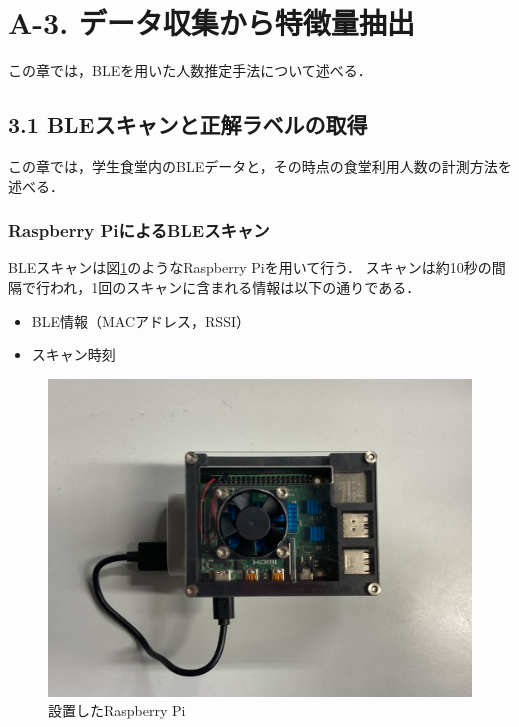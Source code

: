 \section*{A-3. データ収集から特徴量抽出}
この章では，BLEを用いた人数推定手法について述べる．

\subsection*{3.1 BLEスキャンと正解ラベルの取得}
この章では，学生食堂内のBLEデータと，その時点の食堂利用人数の計測方法を述べる．

\subsubsection*{Raspberry PiによるBLEスキャン}
BLEスキャンは図\ref{raspi}のようなRaspberry Piを用いて行う．
スキャンは約10秒の間隔で行われ，1回のスキャンに含まれる情報は以下の通りである．
\begin{itemize}
  \item BLE情報（MACアドレス，RSSI）
  \item スキャン時刻
\end{itemize}

\begin{figure}[pt]
  \includegraphics[scale=0.07]{./images/raspi.jpg}
  \centering
  \caption{設置したRaspberry Pi\label{raspi}}
\end{figure}

